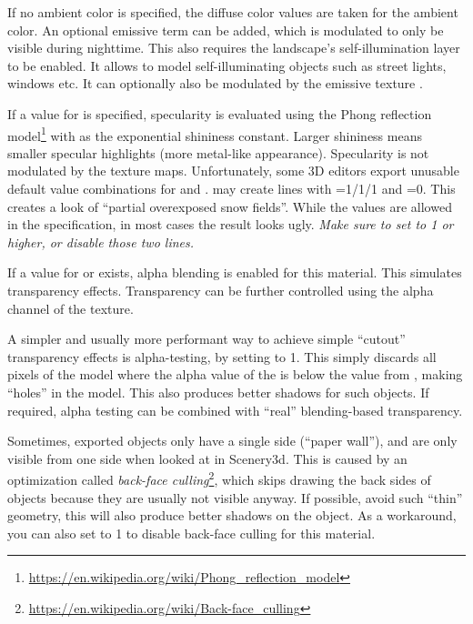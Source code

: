 If no ambient color is specified, the diffuse color values are taken for the
ambient color. An optional emissive term  can be added, which is
modulated to only be visible during nighttime. This also requires the
landscape's self-illumination layer to be enabled. It allows to model
self-illuminating objects such as street lights, windows etc. It can optionally
also be modulated by the emissive texture .

If a value for  is specified, specularity is evaluated
using the Phong reflection
model\footnote{\url{https://en.wikipedia.org/wiki/Phong_reflection_model}}
with  as the exponential shininess constant. Larger
shininess means smaller specular highlights (more metal-like
appearance). Specularity is not modulated by the texture
maps. Unfortunately, some 3D editors export unusable default value
combinations for  and . 
may create lines with =1/1/1 and =0. This
creates a look of ``partial overexposed snow fields''. While the
values are allowed in the specification, in most cases the result
looks ugly. \emph{Make sure to set  to 1 or higher, or
  disable those two lines.}

If a value for  or  exists, alpha blending is enabled for this
material. This simulates transparency effects. Transparency can be further
controlled using the alpha channel of the  texture.

A simpler and usually more performant way to achieve simple ``cutout''
transparency effects is alpha-testing, by setting  to 1. This
simply discards all pixels of the model where the alpha value of the
 is below the  value from
, making ``holes'' in the model. This also produces
better shadows for such objects. If required, alpha testing can be combined with
``real'' blending-based transparency.

Sometimes, exported objects only have a single side (``paper wall''), and are only visible
from one side when looked at in Scenery3d. This is caused by an optimization
called \emph{back-face culling}\footnote{\url{https://en.wikipedia.org/wiki/Back-face_culling}},
which skips drawing the back sides of objects because they are usually
not visible anyway. If possible, avoid such ``thin'' geometry, this will also
produce better shadows on the object. As a workaround, you can also set
 to 1 to disable back-face culling for this material.

